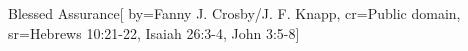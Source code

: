 {Blessed Assurance}[
	by={Fanny J. Crosby/J. F. Knapp},
    cr={Public domain},
    sr={Hebrews 10:21-22, Isaiah 26:3-4, John 3:5-8}]
